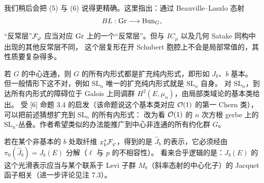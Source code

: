 我们稍后会把 (5) 与 (6) 说得更精确。这里指出：通过 Beauville–Laszlo 态射
\[
BL:\mathrm{Gr}\longrightarrow\mathrm{Bun}_G,
\]
“反常层”$\mathcal{F}_\varphi$ 应当对应 $\mathrm{Gr}$ 上的一个“反常层”。但与 $IC_\mu$ 以及几何 Satake 同构中出现的其他反常层不同，
这个层复形在开 Schubert 胞腔上不会是局部常值的，其性质要复杂得多。

\begin{remark}\label{rem:4.5}
若 $G$ 的中心连通，则 $G$ 的所有内形式都是扩充纯内形式，即形如 $J_b$、$b$ 基本。
但一般情形下这不对，例如 $\mathrm{SL}_n$ 唯一的扩充纯内形式就是 $\mathrm{SL}_n$ 自身。
对 $\mathrm{SL}_n$，到达所有内形式的障碍位于 Galois 上同调群 $H^2(E,\mu_n)$，由局部类域论的基本类给出。
受 [6] 命题 3.4 的启发（该命题说这个基本类对应 $\mathcal{O}(1)$ 的第一 Chern 类），可以把前述猜想扩充到 $\mathrm{SL}_n$ 的所有内形式：
改为看 $\mathcal{O}(1)$ 的 $n$ 次方根 gerbe 上的 $\mathrm{SL}_n$-丛叠。作者希望类似的办法能推广到中心非连通的所有约化群 $G$。
\end{remark}

\begin{remark}\label{rem:4.6}
若在某个非基本的 $b$ 处取纤维 $x_b^*\mathcal{F}_\varphi$，得到的是 $\widehat{J}_b$ 的表示，它必须经由 $\pi_0(\widehat{J}_b)=J_b(E)$ 分解（$\ell$ 与 $p$ 的不相容性）。
看来合乎逻辑的是：$J_b(E)$ 的这个光滑表示应当与某个联系于 Levi 子群 $M_b$（斜率态射的中心化子）的 Jacquet 函子相关（进一步评论见注 7.3）。
\end{remark}
